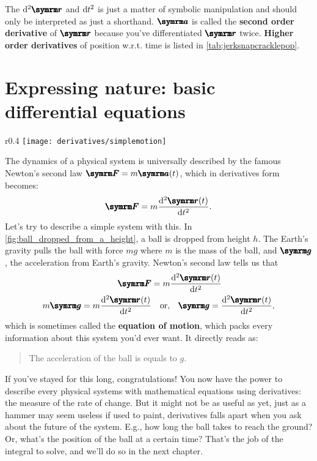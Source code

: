 The $\odif[ord = 2]{\vv{r}}$ and $\odif{t}^2$ is just a matter of symbolic manipulation and should only be interpreted as just a shorthand. $\vv{a}$ is called the \textbf{second order derivative} of $\vv{r}$ because you've differentiated $\vv{r}$ twice. \textbf{Higher order derivatives} of position w.r.t. time is listed in \cref{tab:jerksnapcracklepop}.

\section{Expressing nature: basic differential equations}
\label{sec:basicdifferentialequations}

\begin{wrapfigure}[14]{r}{0.4\textwidth}
    \centering
    \texttt{[image: derivatives/simplemotion]}
    \caption{A ball dropped from height $h$}
    \label{fig:ball_dropped_from_a_height}
\end{wrapfigure}
The dynamics of a physical system is universally described by the famous Newton's second law $\vv{F} = m\vv{a}(t)$, which in derivatives form becomes:
\begin{equation}
    \vv{F} = m\odv[ord = 2]{\vv{r}(t)}{t}. \label{eq:newton_second_law}
\end{equation}
Let's try to describe a simple system with this. In \cref{fig:ball_dropped_from_a_height}, a ball is dropped from height $h$. The Earth's gravity pulls the ball with force $mg$ where $m$ is the mass of the ball, and $\vv{g}$, the acceleration from Earth's gravity. Newton's second law tells us that
\begin{align}
    \vv{F} &= m\odv[ord = 2]{\vv{r}(t)}{t} \\
    m\vv{g} = m\odv[ord = 2]{\vv{r}(t)}{t} &\quad \textrm{or,} \quad \vv{g} = \odv[ord = 2]{\vv{r}(t)}{t},
\end{align}
which is sometimes called the \textbf{equation of motion}, which packs every information about this system you'd ever want. It directly reads as:
\begin{quotation}
    The acceleration of the ball is equals to $g$.
\end{quotation}
If you've stayed for this long, congratulations! You now have the power to describe every physical systems with mathematical equations using derivatives: the measure of the rate of change. But it might not be as useful as yet, just as a hammer may seem useless if used to paint, derivatives falls apart when you ask about the future of the system. E.g., how long the ball takes to reach the ground? Or, what's the position of the ball at a certain time? That's the job of the integral to solve, and we'll do so in the next chapter.


